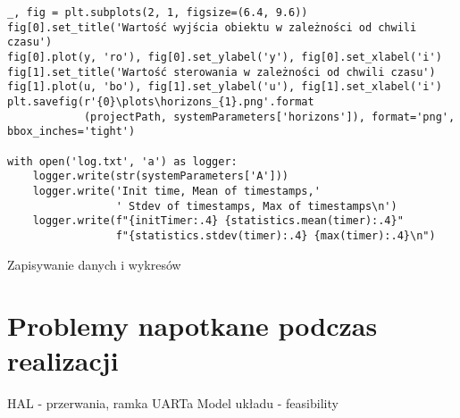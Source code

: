 \begin{listing}[htb]
\begin{verbatim}
_, fig = plt.subplots(2, 1, figsize=(6.4, 9.6))
fig[0].set_title('Wartość wyjścia obiektu w zależności od chwili czasu')
fig[0].plot(y, 'ro'), fig[0].set_ylabel('y'), fig[0].set_xlabel('i')
fig[1].set_title('Wartość sterowania w zależności od chwili czasu')
fig[1].plot(u, 'bo'), fig[1].set_ylabel('u'), fig[1].set_xlabel('i')
plt.savefig(r'{0}\plots\horizons_{1}.png'.format
            (projectPath, systemParameters['horizons']), format='png', bbox_inches='tight')

with open('log.txt', 'a') as logger:
    logger.write(str(systemParameters['A']))
    logger.write('Init time, Mean of timestamps,'
                 ' Stdev of timestamps, Max of timestamps\n')
    logger.write(f"{initTimer:.4} {statistics.mean(timer):.4}"
                 f"{statistics.stdev(timer):.4} {max(timer):.4}\n")
\end{verbatim}
\caption{Zapisywanie danych i wykresów}
\label{lst:write_py}
\end{listing}

\section{Problemy napotkane podczas realizacji} \label{sec:problems}
HAL - przerwania, ramka UARTa
Model układu - feasibility
